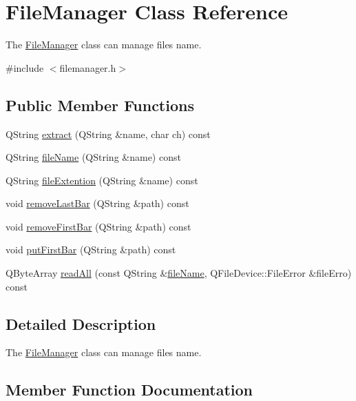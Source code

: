 \hypertarget{class_file_manager}{}\section{File\+Manager Class Reference}
\label{class_file_manager}


The \hyperlink{class_file_manager}{File\+Manager} class can manage file\textquotesingle{}s name.  




{\ttfamily \#include $<$filemanager.\+h$>$}

\subsection*{Public Member Functions}
\begin{DoxyCompactItemize}
\item 
Q\+String \hyperlink{class_file_manager_a02a841bf0edcc2c338a315efdfbd716e}{extract} (Q\+String \&name, char ch) const
\item 
Q\+String \hyperlink{class_file_manager_af8ecdb77f87698fb34f4c65ae9cde87e}{file\+Name} (Q\+String \&name) const
\item 
Q\+String \hyperlink{class_file_manager_a91752dbc36b0cd256d09917dbcf49f30}{file\+Extention} (Q\+String \&name) const
\item 
void \hyperlink{class_file_manager_abebe8f302627b2e8db0bf911487bd04d}{remove\+Last\+Bar} (Q\+String \&path) const
\item 
void \hyperlink{class_file_manager_a79f0d0e4d4528d0f98496c84a43ff06b}{remove\+First\+Bar} (Q\+String \&path) const
\item 
void \hyperlink{class_file_manager_a1fac5226f52353dd6e928ce25ae5c1cb}{put\+First\+Bar} (Q\+String \&path) const
\item 
Q\+Byte\+Array \hyperlink{class_file_manager_a2f00c43fed6befb1136502c6db2f7dee}{read\+All} (const Q\+String \&\hyperlink{class_file_manager_af8ecdb77f87698fb34f4c65ae9cde87e}{file\+Name}, Q\+File\+Device\+::\+File\+Error \&file\+Erro) const
\end{DoxyCompactItemize}


\subsection{Detailed Description}
The \hyperlink{class_file_manager}{File\+Manager} class can manage file\textquotesingle{}s name. 

\subsection{Member Function Documentation}
\mbox{\label{class_file_manager_a02a841bf0edcc2c338a315efdfbd716e}} 
